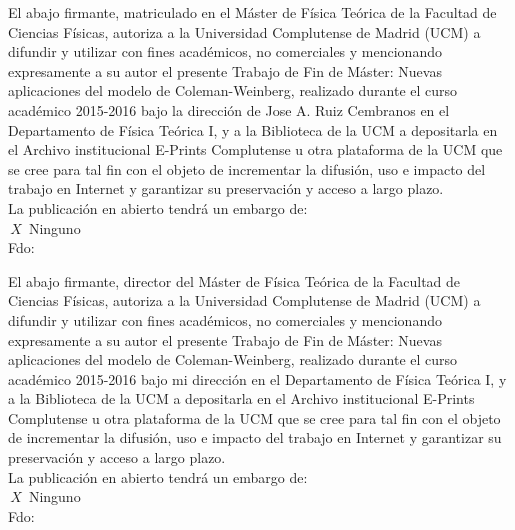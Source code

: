\documentclass[aps,prd,preprintnumbers,nofootinbibn,twocolumn]{revtex4}
\begin{document}
\begin{widetext}
El abajo firmante, matriculado en el Máster de Física Teórica de la Facultad de Ciencias Físicas, autoriza a la Universidad Complutense de Madrid (UCM) a difundir y utilizar con fines académicos, no comerciales y mencionando expresamente a su autor el presente Trabajo de Fin de Máster: Nuevas aplicaciones del modelo de Coleman-Weinberg, realizado durante el curso académico 2015-2016 bajo la dirección de Jose A. Ruiz Cembranos en el Departamento de Física Teórica I, y a la Biblioteca de la UCM a depositarla en el Archivo institucional E-Prints Complutense u otra plataforma de la UCM que se cree para tal fin con el objeto de incrementar la difusión, uso e impacto del trabajo en Internet y garantizar su preservación y acceso a largo plazo.\\

La publicación en abierto tendrá un embargo de:
\\

\noindent$\,X\,$ Ninguno
\\


Fdo:\\


\vspace{3cm}

El abajo firmante, director del Máster de Física Teórica de la Facultad de Ciencias Físicas, autoriza a la Universidad Complutense de Madrid (UCM) a difundir y utilizar con fines académicos, no comerciales y mencionando expresamente a su autor el presente Trabajo de Fin de Máster: Nuevas aplicaciones del modelo de Coleman-Weinberg, realizado durante el curso académico 2015-2016 bajo mi dirección en el Departamento de Física Teórica I, y a la Biblioteca de la UCM a depositarla en el Archivo institucional E-Prints Complutense u otra plataforma de la UCM que se cree para tal fin con el objeto de incrementar la difusión, uso e impacto del trabajo en Internet y garantizar su preservación y acceso a largo plazo.\\

La publicación en abierto tendrá un embargo de:
\\

\noindent$\,X\,$ Ninguno
\\


Fdo:\\


\vspace{12cm}

\end{widetext}
\end{document}
